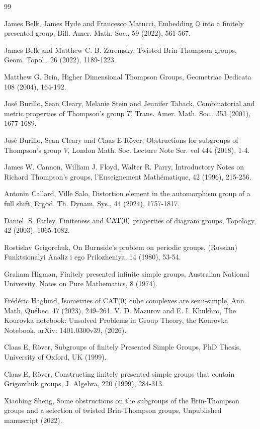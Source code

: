\documentclass[12pt,reqno]{amsart}
\theoremstyle{plain}
\theoremstyle{definition}
\theoremstyle{remark}
\numberwithin{equation}{section}
\begin{document}
%
%
\medskip 
\begin{thebibliography}{99} 

James Belk, James Hyde and Francesco Matucci, 
Embedding  $\mathbb{Q}$  into a finitely presented group, 
Bill. Amer. Math. Soc., 59 (2022), 561-567.  

James Belk and Matthew C. B. Zaremsky,
Twisted Brin-Thompson groups, 
Geom. Topol., 26 (2022), 1189-1223.

Matthew G. Brin, Higher Dimensional Thompson Groups, 
Geometriae Dedicata 108 (2004), 164-192.  

Jos\'{e} Burillo, Sean Cleary, Melanie Stein and Jennifer Taback, 
Combinatorial and metric properties of Thompson's group  $T$, 
Trans. Amer. Math. Soc., 353 (2001), 1677-1689.  

Jos\'{e} Burillo, 
Sean Cleary and Claas E R\"{o}ver, 
Obstructions for subgroups of Thompson's group $V$, 
London Math. Soc. Lecture Note Ser. vol 444 (2018), 1-4.  

James W. Cannon,  William J. Floyd, Walter R. Parry, 
Introductory Notes on Richard Thompson's groups, 
l'Enseignement Math\'ematique, 42 (1996), 215-256.  

Antonin Callard, Ville Salo,
Distortion element in the automorphism group of a full shift, 
Ergod. Th. Dynam. Sys., 
44 (2024), 1757-1817. 

Daniel. S. Farley,
Finiteness and ${\rm CAT(0)}$ properties of diagram groups,
Topology, 42 (2003), 1065-1082. 

Rostislav Grigorchuk,
On Burnside's problem on periodic groups, 
(Russian) Funktsionalyi Analiz i ego Prilozheniya, 14 (1980), 53-54.  

Graham Higman, 
Finitely presented infinite simple groups, 
Australian National University, 
Notes on Pure Mathematics, 8 (1974).  

Fr\'ed\'eric Haglund, 
Isometries of CAT(0) cube complexes are semi-simple, 
Ann. Math, Qu\'ebec. 47 (2023), 249--261. 
%
V. D. Mazurov and E. I. Khukhro, 
The Kourovka notebook: Unsolved Problems in Group Theory, 
the Kourovka Notebook, arXiv: 1401.0300v39, (2026).

Claas E, R\"{o}ver, 
Subgroups of finitely Presented Simple Groups,
PhD Thesis, University of Oxford, UK (1999).

Claas E, R\"{o}ver,  
Constructing finitely presented simple groups 
that contain Grigorchuk groups, 
J. Algebra, 220 (1999), 284-313.    

Xiaobing Sheng, 
Some obstructions on the subgroups of the Brin-Thompson groups and a selection of 
twisted Brin-Thompson groups, 
Unpublished manuscript  (2022). 

\end{thebibliography}
\end{document}
